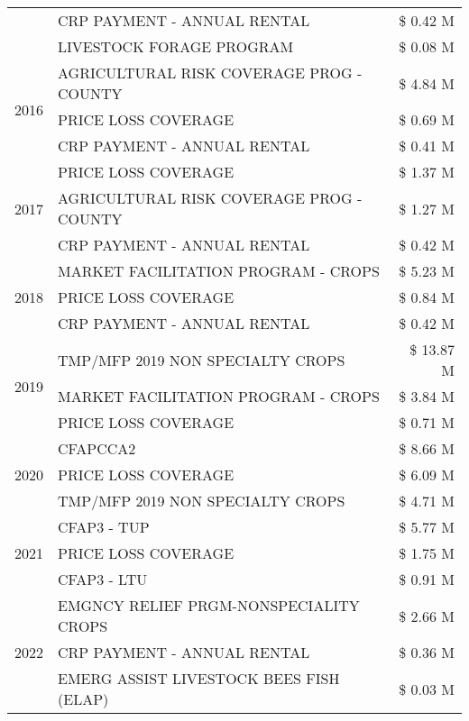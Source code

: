 \begin{tabular}{llr}
 & CRP PAYMENT - ANNUAL RENTAL & \$ 0.42 M \\
 & LIVESTOCK FORAGE PROGRAM & \$ 0.08 M \\
\cline{1-3}
\multirow[t]{3}{*}{2016} & AGRICULTURAL RISK COVERAGE PROG - COUNTY & \$ 4.84 M \\
 & PRICE LOSS COVERAGE & \$ 0.69 M \\
 & CRP PAYMENT - ANNUAL RENTAL & \$ 0.41 M \\
\cline{1-3}
\multirow[t]{3}{*}{2017} & PRICE LOSS COVERAGE & \$ 1.37 M \\
 & AGRICULTURAL RISK COVERAGE PROG - COUNTY & \$ 1.27 M \\
 & CRP PAYMENT - ANNUAL RENTAL & \$ 0.42 M \\
\cline{1-3}
\multirow[t]{3}{*}{2018} & MARKET FACILITATION PROGRAM - CROPS & \$ 5.23 M \\
 & PRICE LOSS COVERAGE & \$ 0.84 M \\
 & CRP PAYMENT - ANNUAL RENTAL & \$ 0.42 M \\
\cline{1-3}
\multirow[t]{3}{*}{2019} & TMP/MFP 2019 NON SPECIALTY CROPS & \$ 13.87 M \\
 & MARKET FACILITATION PROGRAM - CROPS & \$ 3.84 M \\
 & PRICE LOSS COVERAGE & \$ 0.71 M \\
\cline{1-3}
\multirow[t]{3}{*}{2020} & CFAPCCA2 & \$ 8.66 M \\
 & PRICE LOSS COVERAGE & \$ 6.09 M \\
 & TMP/MFP 2019 NON SPECIALTY CROPS & \$ 4.71 M \\
\cline{1-3}
\multirow[t]{3}{*}{2021} & CFAP3 - TUP & \$ 5.77 M \\
 & PRICE LOSS COVERAGE & \$ 1.75 M \\
 & CFAP3 - LTU & \$ 0.91 M \\
\cline{1-3}
\multirow[t]{3}{*}{2022} & EMGNCY RELIEF PRGM-NONSPECIALITY CROPS & \$ 2.66 M \\
 & CRP PAYMENT - ANNUAL RENTAL & \$ 0.36 M \\
 & EMERG ASSIST LIVESTOCK BEES FISH (ELAP) & \$ 0.03 M \\
\cline{1-3}
\bottomrule
\end{tabular}
